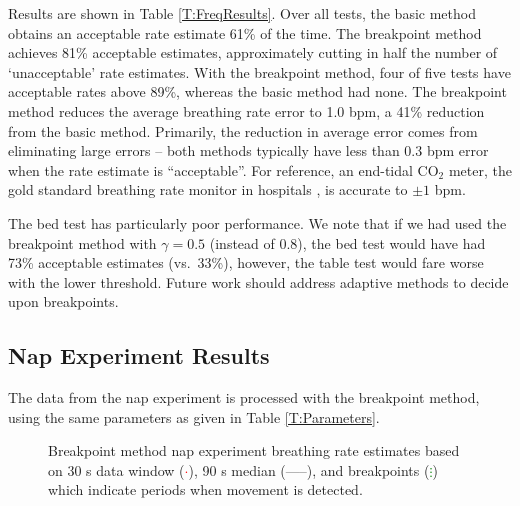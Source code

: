 \documentclass[10pt,journal,letterpaper]{IEEEtran}
\begin{document}
Results are shown in Table \ref{T:FreqResults}.  Over all tests, the basic method obtains an acceptable rate estimate 61\% of the time.  The breakpoint method achieves 81\% acceptable estimates, approximately cutting in half the number of `unacceptable' rate estimates.  With the breakpoint method, four of five tests have acceptable rates above 89\%, whereas the basic method had none.  The breakpoint method reduces the average breathing rate error to 1.0 bpm, a 41\% reduction from the basic method.  Primarily, the reduction in average error comes from eliminating large errors -- both methods typically have less than 0.3 bpm error when the rate estimate is ``acceptable''.  For reference, an end-tidal CO$_2$ meter, the gold standard breathing rate monitor in hospitals \cite{cook2011major}, is accurate to $\pm 1$ bpm.

The bed test has particularly poor performance.   We note that if we had used the breakpoint method with $\gamma = 0.5$ (instead of 0.8), the bed test would have had 73\% acceptable estimates (vs.~33\%), however, the table test would fare worse with the lower threshold.  Future work should address adaptive methods to decide upon breakpoints.

\subsection{Nap Experiment Results}
The data from the nap experiment is processed with the breakpoint method, using the same parameters as given in Table \ref{T:Parameters}.  

\begin{figure}[htbp]
\centerline{ }
\caption{Breakpoint method nap experiment breathing rate estimates based on 30 s data window (\textcolor{red}{$\cdot$}), 90 s median (\textcolor{Mulberry}{-----}), and breakpoints (\textcolor{green}{$\vdots$}) which indicate periods when movement is detected.  }
    \label{F:nap_fHat_breakpts_median_vs_time}
\end{figure}
\end{document}
